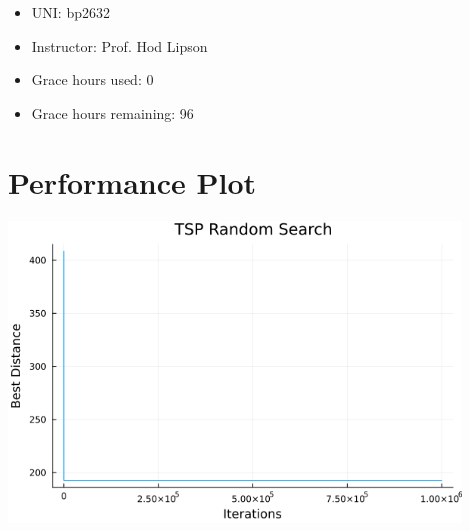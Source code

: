 \documentclass[twoside,11pt]{homework}
\date{September 17, 2023} %
\begin{document}
\maketitle
\begin{itemize}
    \item UNI: bp2632
    \item Instructor: Prof. Hod Lipson
    \item Grace hours used: 0 
    \item Grace hours remaining: 96
\end{itemize}
\newpage


\section*{Performance Plot}

\includegraphics[width=0.9\textwidth]{../code_hw1/TSP_random_search.png}
\end{document}
